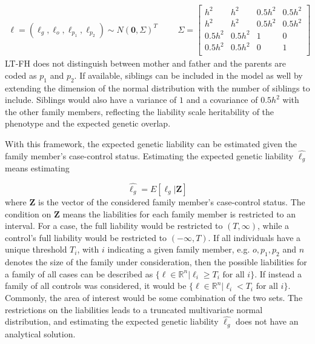 \begin{align*}
\ell = \left( \ell_g, \ell_o, \ell_{p_1}, \ell_{p_2} \right) \sim N(\mathbf{0}, \Sigma)^T & & &\Sigma = \begin{bmatrix}
h^2	&	h^2	&	0.5h^2	&	0.5h^2	\\
h^2 &	h^2 &	0.5h^2	&	0.5h^2	\\
0.5h^2	&	0.5h^2	&	1	&	0	\\
0.5h^2	&	0.5h^2	&	0	&	1	\\
\end{bmatrix}
\end{align*}
LT-FH does not distinguish between mother and father and the parents are coded as $ p_1 $ and $ p_2 $. If available, siblings can be included in the model as well by extending the dimension of the normal distribution with the number of siblings to include. Siblings would also have a variance of $ 1 $ and a covariance of $ 0.5h^2 $ with the other family members, reflecting the liability scale heritability of the phenotype and the expected genetic overlap.

With this framework, the expected genetic liability can be estimated given the family member's case-control status. Estimating the expected genetic liability $ \hat{\ell_g} $ means estimating 

\begin{equation*}
\hat{\ell_g} = E\left[ \ell_g | \mathbf{Z} \right]
\end{equation*}
where $ \mathbf{Z} $ is the vector of the considered family member's case-control status. The condition on $ \mathbf{Z} $ means the liabilities for each family member is restricted to an interval. For a case, the full liability would be restricted to $ (T, \infty) $, while a control's full liability would be restricted to $ (-\infty, T) $. If all individuals have a unique threshold $ T_i $, with $ i $ indicating a given family member, e.g. $ o, p_1, p_2 $ and $ n $ denotes the size of the family under consideration, then the possible liabilities for a family of all cases can be described as $ \{ \ell \in \mathbb{R}^n | \ell_i \geq T_i \text{ for all } i\} $. If instead a family of all controls was considered, it would be $ \{ \ell \in \mathbb{R}^n | \ell_i < T_i \text{ for all } i\} $. Commonly, the area of interest would be some combination of the two sets. The restrictions on the liabilities leads to a truncated multivariate normal distribution, and estimating the expected genetic liability $ \hat{\ell_g} $ does not have an analytical solution. 

